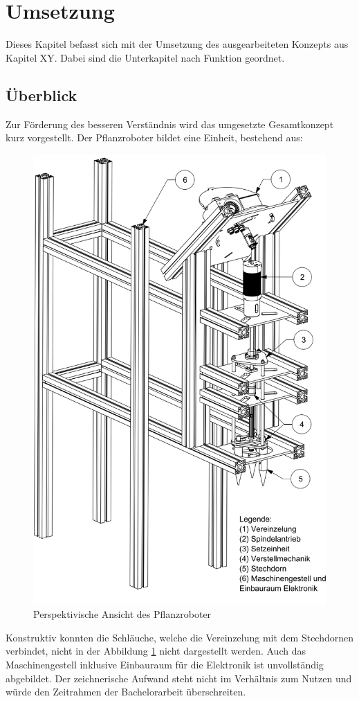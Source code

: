 \newpage
\section{Umsetzung}
Dieses Kapitel befasst sich mit der Umsetzung des ausgearbeiteten Konzepts aus Kapitel XY. Dabei sind die Unterkapitel nach Funktion geordnet.

\subsection{Überblick}
Zur Förderung des besseren Verständnis wird das umgesetzte Gesamtkonzept kurz vorgestellt.  Der Pflanzroboter bildet eine Einheit, bestehend aus:
	\begin{figure}[H]
	\includegraphics[scale=0.55]{Illustrationen/6-Umsetzung/uberblick.png}
	\caption{Perspektivische Ansicht des Pflanzroboter}
	\label{fig:uberblick}
	\end{figure}
Konstruktiv konnten die Schläuche, welche die Vereinzelung mit dem Stechdornen verbindet, nicht in der Abbildung \ref{fig:uberblick} nicht dargestellt werden. Auch das Maschinengestell inklusive Einbauraum für die Elektronik ist unvollständig abgebildet. Der zeichnerische Aufwand steht nicht im Verhältnis zum Nutzen und würde den Zeitrahmen der Bachelorarbeit überschreiten. 
